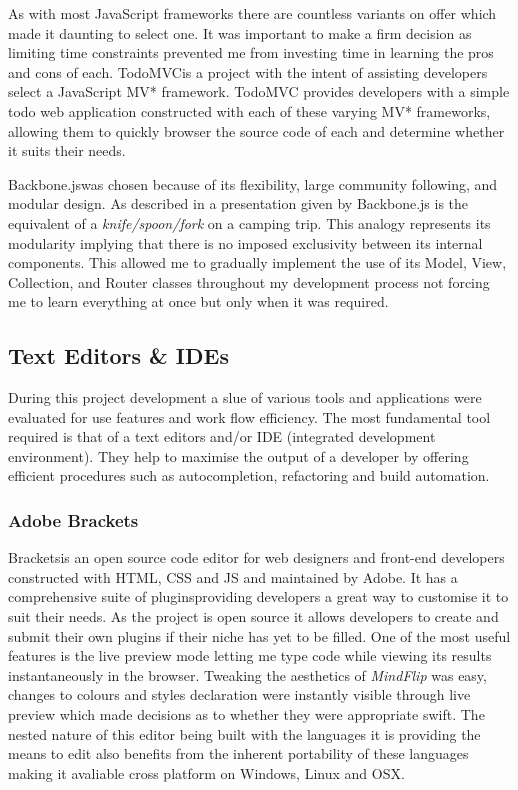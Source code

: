 \documentclass[final]{cmpreport}
\begin{document}
As with most JavaScript frameworks there are countless variants on offer which made it daunting to select one. It was important to make a firm decision as limiting time constraints prevented me from investing time in learning the pros and cons of each. TodoMVC\footnotemark is a project with the intent of assisting developers select a JavaScript MV* framework. TodoMVC provides developers with a simple todo web application constructed with each of these varying MV* frameworks, allowing them to quickly browser the source code of each and determine whether it suits their needs.


Backbone.js\footnotemark was chosen because of its flexibility, large community following, and modular design. As described in a presentation given by \citet{Bull} Backbone.js is the equivalent of a \textit{knife/spoon/fork} on a camping trip. This analogy represents its modularity implying that there is no imposed exclusivity between its internal components. This allowed me to gradually implement the use of its Model, View, Collection, and Router classes throughout my development process not forcing me to learn everything at once but only when it was required.


\subsection{Text Editors \& IDEs}
During this project development a slue of various tools and applications were evaluated for use features and work flow efficiency. The most fundamental tool required is that of a text editors and/or IDE (integrated development environment). They help to maximise the output of a developer by offering efficient procedures such as autocompletion, refactoring and build automation.

\subsubsection{Adobe Brackets}
Brackets\footnotemark[27] is an open source code editor for web designers and front-end developers constructed with HTML, CSS and JS and maintained by Adobe. It has a comprehensive suite of plugins\footnotemark[28] providing developers a great way to customise it to suit their needs. As the project is open source it allows developers to create and submit their own plugins if their niche has yet to be filled. One of the most useful features is the live preview mode letting me type code while viewing its results instantaneously in the browser. Tweaking the aesthetics of \textit{MindFlip} was easy, changes to colours and styles declaration were instantly visible through live preview which made decisions as to whether they were appropriate swift. The nested nature of this editor being built with the languages it is providing the means to edit also benefits from the inherent portability of these languages making it avaliable cross platform on Windows, Linux and OSX.
\end{document}
